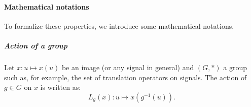             \paragraph{Mathematical notations}
                To formalize these properties, we introduce some mathematical notations.
                \subparagraph{Action of a group}
                    Let $x: u \mapsto x(u)$ be an image (or any signal in general) and $(G, *)$ a group such as, for example, the set of translation operators on signals.
                    The action of $g\in G$ on $x$ is written as:
                    \begin{equation}
                        \label{eq::action_group}
                        L_g(x): u \mapsto x\left(g^{-1}(u)\right).
                    \end{equation}
                
